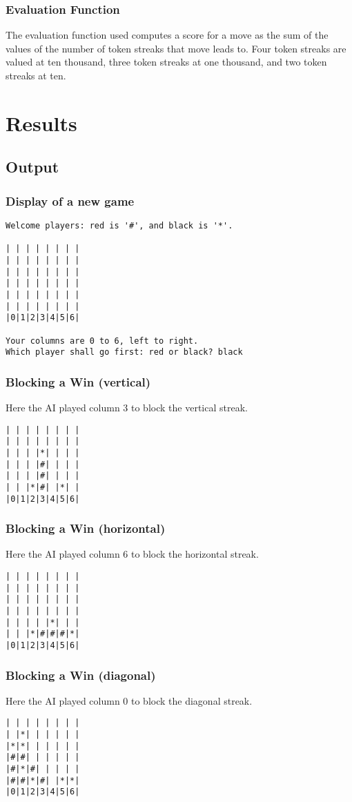 \documentclass[12pt, article]{scrartcl}
\begin{document}
\subsubsection{Evaluation Function}
The evaluation function used computes a score for a move as the sum of the values of the number of token streaks that move leads to. Four token streaks are valued at ten thousand, three token streaks at one thousand, and two token streaks at ten.

\section{Results}
\subsection{Output}
\subsubsection{Display of a new game}
\begin{verbatim}
Welcome players: red is '#', and black is '*'.

| | | | | | | |
| | | | | | | |
| | | | | | | |
| | | | | | | |
| | | | | | | |
| | | | | | | |
|0|1|2|3|4|5|6|

Your columns are 0 to 6, left to right.
Which player shall go first: red or black? black
\end{verbatim}

\subsubsection{Blocking a Win (vertical)}
Here the AI played column 3 to block the vertical streak.
\begin{verbatim}
| | | | | | | |
| | | | | | | |
| | | |*| | | |
| | | |#| | | |
| | | |#| | | |
| | |*|#| |*| |
|0|1|2|3|4|5|6|
\end{verbatim}

\subsubsection{Blocking a Win (horizontal)}
Here the AI played column 6 to block the horizontal streak.
\begin{verbatim}
| | | | | | | |
| | | | | | | |
| | | | | | | |
| | | | | | | |
| | | | |*| | |
| | |*|#|#|#|*|
|0|1|2|3|4|5|6|
\end{verbatim}

\subsubsection{Blocking a Win (diagonal)}
Here the AI played column 0 to block the diagonal streak.
\begin{verbatim}
| | | | | | | |
| |*| | | | | |
|*|*| | | | | |
|#|#| | | | | |
|#|*|#| | | | |
|#|#|*|#| |*|*|
|0|1|2|3|4|5|6|
\end{verbatim}
\end{document}
